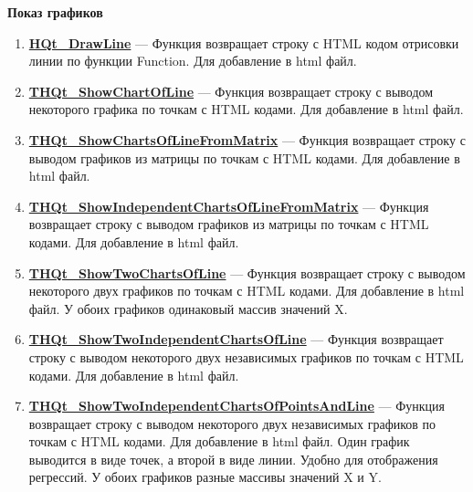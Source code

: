 \documentclass[a4paper,12pt]{article}
\begin{document}
\textbf{Показ графиков}
\begin{enumerate}

\item \textbf{\hyperref[HQt_DrawLine]{HQt\_DrawLine}} --- Функция возвращает строку с HTML кодом отрисовки линии по функции Function. Для добавление в html файл.

\item \textbf{\hyperref[THQt_ShowChartOfLine]{THQt\_ShowChartOfLine}} --- Функция возвращает строку с выводом некоторого графика по точкам с HTML кодами. Для добавление в html файл.

\item \textbf{\hyperref[THQt_ShowChartsOfLineFromMatrix]{THQt\_ShowChartsOfLineFromMatrix}} --- Функция возвращает строку с выводом графиков из матрицы по точкам с HTML кодами. Для добавление в html файл.

\item \textbf{\hyperref[THQt_ShowIndependentChartsOfLineFromMatrix]{THQt\_ShowIndependentChartsOfLineFromMatrix}} --- Функция возвращает строку с выводом графиков из матрицы по точкам с HTML кодами. Для добавление в html файл.

\item \textbf{\hyperref[THQt_ShowTwoChartsOfLine]{THQt\_ShowTwoChartsOfLine}} --- Функция возвращает строку с выводом некоторого двух графиков по точкам с HTML кодами. Для добавление в html файл. У обоих графиков одинаковый массив значений X.

\item \textbf{\hyperref[THQt_ShowTwoIndependentChartsOfLine]{THQt\_ShowTwoIndependentChartsOfLine}} --- Функция возвращает строку с выводом некоторого двух независимых графиков по точкам с HTML кодами. Для добавление в html файл.

\item \textbf{\hyperref[THQt_ShowTwoIndependentChartsOfPointsAndLine]{THQt\_ShowTwoIndependentChartsOfPointsAndLine}} --- Функция возвращает строку с выводом некоторого двух независимых графиков по точкам с HTML кодами. Для добавление в html файл. Один график выводится в виде точек, а второй в виде линии. Удобно для отображения регрессий. У обоих графиков разные массивы значений X и Y.

\end{enumerate}
\end{document}
